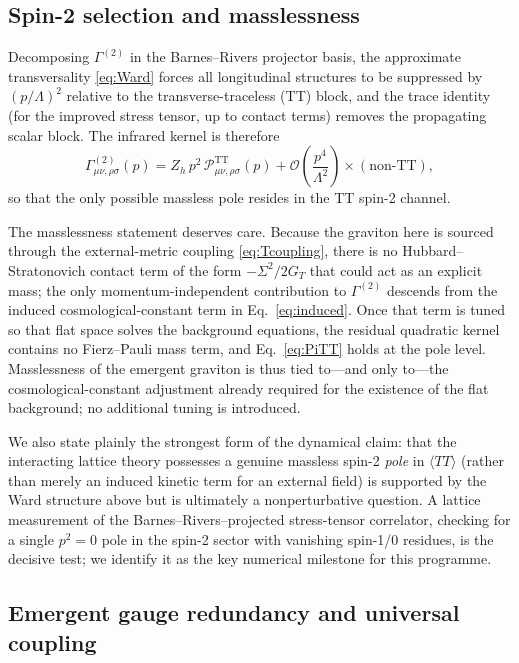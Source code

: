 \documentclass[11pt,a4paper]{article}
\begin{document}
\subsection{Spin-2 selection and masslessness}

Decomposing $\Gamma^{(2)}$ in the Barnes--Rivers projector basis,
the approximate transversality \eqref{eq:Ward} forces all
longitudinal structures to be suppressed by $(p/\Lambda)^2$
relative to the transverse-traceless (TT) block, and the trace
identity (for the improved stress tensor, up to contact terms)
removes the propagating scalar block.
The infrared kernel is therefore
\begin{equation}
\Gamma^{(2)}_{\mu\nu,\rho\sigma}(p)
= Z_h\,p^2\,
\mathcal{P}^{\mathrm{TT}}_{\mu\nu,\rho\sigma}(p)
+ \mathcal{O}\!\left(\frac{p^4}{\Lambda^2}\right)
\times(\text{non-TT}),
\label{eq:PiTT}
\end{equation}
so that the only possible massless pole resides in the TT spin-2
channel.

The masslessness statement deserves care.
Because the graviton here is sourced through the external-metric
coupling \eqref{eq:Tcoupling}, there is no Hubbard--Stratonovich
contact term of the form $-\Sigma^2/2G_T$ that could act as an
explicit mass; the only momentum-independent contribution to
$\Gamma^{(2)}$ descends from the induced cosmological-constant term
in Eq.~\eqref{eq:induced}.
Once that term is tuned so that flat space solves the background
equations, the residual quadratic kernel contains no Fierz--Pauli
mass term, and Eq.~\eqref{eq:PiTT} holds at the pole level.
Masslessness of the emergent graviton is thus tied to---and only
to---the cosmological-constant adjustment already required for the
existence of the flat background; no additional tuning is
introduced.

We also state plainly the strongest form of the dynamical claim:
that the interacting lattice theory possesses a genuine massless
spin-2 \emph{pole} in $\langle TT \rangle$ (rather than merely an
induced kinetic term for an external field) is supported by the
Ward structure above but is ultimately a nonperturbative question.
A lattice measurement of the Barnes--Rivers--projected
stress-tensor correlator, checking for a single $p^2 = 0$ pole in
the spin-2 sector with vanishing spin-1/0 residues, is the decisive
test; we identify it as the key numerical milestone for this
programme.

\subsection{Emergent gauge redundancy and universal coupling}
\end{document}
